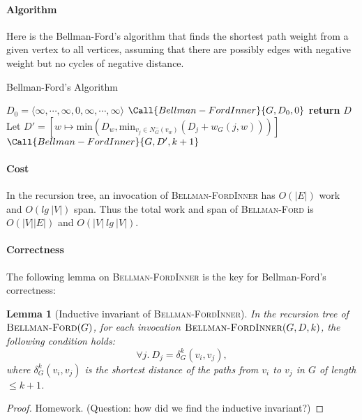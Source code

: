 \documentclass[11pt,a4paper,oneside,microtype,chapter,nokorean]{oblivoir}
\newtheorem{lemma}[theorem]{Lemma}
\begin{document}
\paragraph{Algorithm}

Here is the Bellman-Ford's algorithm that finds the shortest path weight from a given vertex to all
vertices, assuming that there are possibly edges with negative weight but no cycles of negative
distance.

\begin{algorithm}
  \caption{Bellman-Ford's Algorithm}\label{dijkstra}
  \begin{algorithmic}[1]
     
    \State $D_0 = \langle \infty, \cdots, \infty, 0, \infty, \cdots, \infty \rangle$ 
    \State $\Call{Bellman-FordInner}{G,D_0,0}$
    \EndProcedure
    \Statex
     
    \State \textbf{return} $D$
    \EndIf
    \State Let $D' = [w \mapsto \textrm{min}(D_w, \textrm{min}_{v_j \in N^-_G(v_w)} (D_j + w_G(j,w)))]$
    \State $\Call{Bellman-FordInner}{G,D',k+1}$
    \EndProcedure
  \end{algorithmic}
\end{algorithm}


\paragraph{Cost}

In the recursion tree, an invocation of \textsc{Bellman-FordInner} has $O(|E|)$ work and $O(lg~|V|)$
span.  Thus the total work and span of \textsc{Bellman-Ford} is $O(|V||E|)$ and $O(|V|~lg~|V|)$.



\paragraph{Correctness} The following lemma on \textsc{Bellman-FordInner} is the key for Bellman-Ford's
correctness:

\begin{lemma}[Inductive invariant of \textsc{Bellman-FordInner}] In the recursion tree of
  $\textsc{Bellman-Ford}(G)$, for each invocation $\textsc{Bellman-FordInner}(G,D,k)$, the
  following condition holds:
  \[ \forall j.~D_j = \delta_G^k(v_i,v_j),
  \]  
  where $\delta_G^k(v_i,v_j)$ is the shortest distance of the paths from $v_i$ to $v_j$ in $G$ of
  length $\le k+1$.
\end{lemma}
\begin{proof}
  Homework.  (Question: how did we find the inductive invariant?)
\end{proof}
\end{document}
